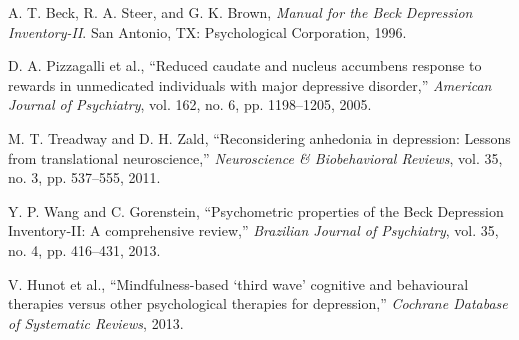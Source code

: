 \documentclass[conference]{IEEEtran}
\begin{document}
\begin{thebibliography}{00}
 A. T. Beck, R. A. Steer, and G. K. Brown, \textit{Manual for the Beck Depression Inventory-II}. San Antonio, TX: Psychological Corporation, 1996.

 D. A. Pizzagalli et al., ``Reduced caudate and nucleus accumbens response to rewards in unmedicated individuals with major depressive disorder,'' \textit{American Journal of Psychiatry}, vol. 162, no. 6, pp. 1198–1205, 2005.

 M. T. Treadway and D. H. Zald, ``Reconsidering anhedonia in depression: Lessons from translational neuroscience,'' \textit{Neuroscience \& Biobehavioral Reviews}, vol. 35, no. 3, pp. 537–555, 2011.

 Y. P. Wang and C. Gorenstein, ``Psychometric properties of the Beck Depression Inventory-II: A comprehensive review,'' \textit{Brazilian Journal of Psychiatry}, vol. 35, no. 4, pp. 416–431, 2013.

 V. Hunot et al., ``Mindfulness-based `third wave' cognitive and behavioural therapies versus other psychological therapies for depression,'' \textit{Cochrane Database of Systematic Reviews}, 2013.

\end{thebibliography}
\end{document}
